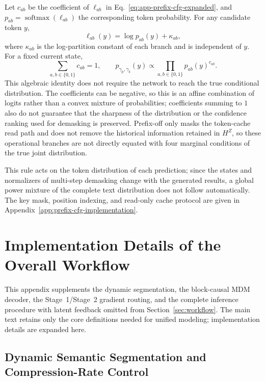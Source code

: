 Let $c_{ab}$ be the coefficient of $\ell_{ab}$ in Eq.~\eqref{eq:app-prefix-cfg-expanded}, and $p_{ab}=\operatorname{softmax}(\ell_{ab})$ the corresponding token probability. For any candidate token $y$,
\begin{equation}
    \ell_{ab}(y)=\log p_{ab}(y)+\kappa_{ab},
    \label{eq:app-cfg-logit-calibration}
\end{equation}
where $\kappa_{ab}$ is the log-partition constant of each branch and is independent of $y$. For a fixed current state,
\begin{equation}
    \sum_{a,b\in\{0,1\}}c_{ab}=1,
    \qquad
    p_{\gamma_{\mathrm p},\gamma_{\mathrm z}}(y)
    \propto\prod_{a,b\in\{0,1\}}p_{ab}(y)^{c_{ab}}.
    \label{eq:app-prefix-cfg-density}
\end{equation}
This algebraic identity does not require the network to reach the true conditional distribution. The coefficients can be negative, so this is an affine combination of logits rather than a convex mixture of probabilities; coefficients summing to $1$ also do not guarantee that the sharpness of the distribution or the confidence ranking used for demasking is preserved. Prefix-off only masks the token-cache read path and does not remove the historical information retained in $H^Z$, so these operational branches are not directly equated with four marginal conditions of the true joint distribution.

This rule acts on the token distribution of each prediction; since the states and normalizers of multi-step demasking change with the generated results, a global power mixture of the complete text distribution does not follow automatically. The key mask, position indexing, and read-only cache protocol are given in Appendix~\ref{app:prefix-cfg-implementation}.

\section{Implementation Details of the Overall Workflow}
\label{app:workflow-details}

This appendix supplements the dynamic segmentation, the block-causal MDM decoder, the Stage~1/Stage~2 gradient routing, and the complete inference procedure with latent feedback omitted from Section~\ref{sec:workflow}. The main text retains only the core definitions needed for unified modeling; implementation details are expanded here.

\subsection{Dynamic Semantic Segmentation and Compression-Rate Control}
\label{app:segmentation}

